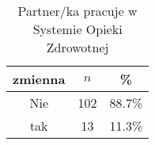 \begin{table}[H]
\caption{Partner/ka pracuje w Systemie Opieki Zdrowotnej}
\centering
\begin{tabular}{ | c | c | c |}
\hline
zmienna & $n$ & \% \\
\hline
Nie  &  102  & 88.7\% \\
\hline
tak  &  13  & 11.3\% \\
\hline
\end{tabular}
\label{tab:Q25}
\end{table}

